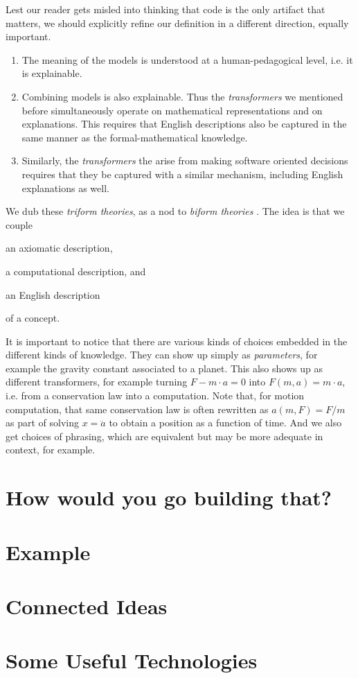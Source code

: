 \documentclass[10pt,twoside,onecolumn,openany,letterpaper]{memoir}
\begin{document}
Lest our reader gets misled into thinking that code is the only artifact
that matters, we should explicitly refine our definition in a different
direction, equally important.
\begin{enumerate}
\item The meaning of the models is understood at a human-pedagogical
level, i.e. it is explainable.
\item Combining models is also explainable. Thus the \emph{transformers}
we mentioned before simultaneously operate on mathematical representations
and on explanations. This requires that English descriptions also be
captured in the same manner as the formal-mathematical knowledge.
\item Similarly, the \emph{transformers} the arise from making software
oriented decisions requires that they be captured with a similar mechanism,
including English explanations as well.
\end{enumerate}

We dub these \emph{triform theories}, as a nod to \emph{biform theories}%
\cite{Farmer}. The idea is that we couple 
\begin{enumerate*}
\item an axiomatic description,
\item a computational description, and
\item an English description
\end{enumerate*}
of a concept.

It is important to notice that there are various kinds of choices
embedded in the different kinds of knowledge. They can show up simply as
\emph{parameters}, for example the gravity constant associated to a planet.
This also shows up as different transformers, for example turning
$F - m\cdot a = 0$ into $F\left(m, a\right) = m\cdot a$, i.e. from a 
conservation law into a computation. Note that, for motion computation, that
same conservation law is often rewritten as $a\left(m,F\right) = F/m$ as
part of solving $x = \ddot{a}$ to obtain a position as a function of time.
And we also get choices of phrasing, which are equivalent but may be more
adequate in context, for example.

\chapter{How would you go building that?}

\chapter{Example}

\chapter{Connected Ideas}

\chapter{Some Useful Technologies}
\end{document}
